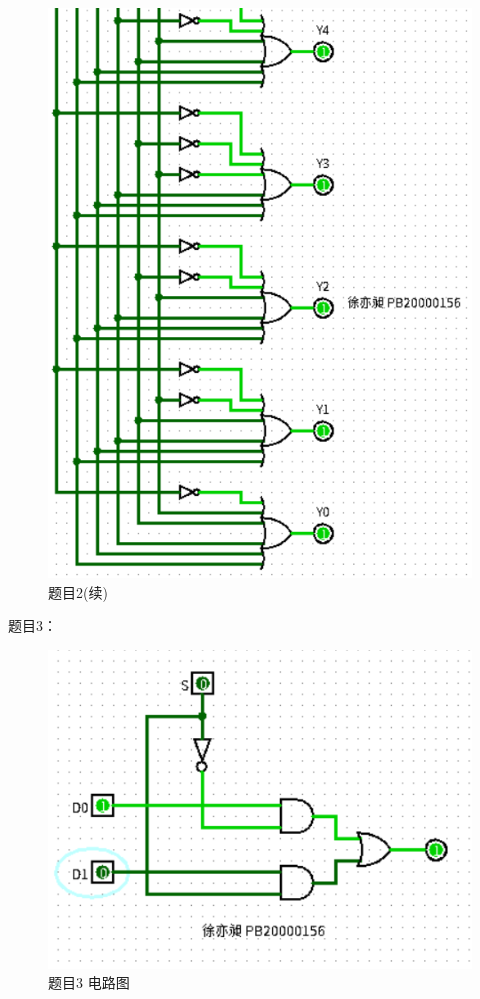 \documentclass[UTF8]{ctexart}
\begin{document}
\newpage
\begin{figure}[h!]
    \centering
    \includegraphics{p2_2.PNG}
    \caption{题目2(续)}
\end{figure}
\newpage
题目3：
\newline
\begin{figure}[h!]
    \centering
    \includegraphics{p3.PNG}
    \caption{题目3 电路图}
\end{figure}
\end{document}
